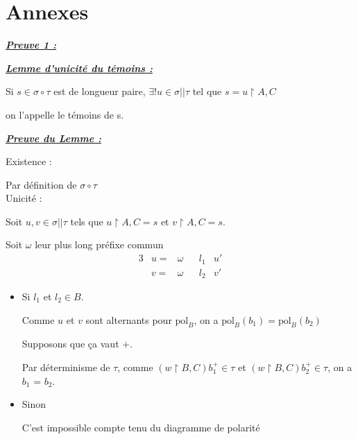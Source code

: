 \documentclass[a4paper,12pt]{article}
\renewenvironment{leftbar}{
  \def\FrameCommand{\vrule width 1pt \hspace{10pt}}
  \MakeFramed {\advance\hsize-\width \FrameRestore}
\setlength{\parskip}{10pt}}
 {\endMakeFramed}
\newenvironment{answer}[1]
{
  \vspace{0.5cm} \noindent \begin{minipage}{\linewidth}
    \textbf{\textit{\uline{#1}}}
    \begin{leftbar}
}
{
    \end{leftbar}\end{minipage}\vspace{0.2cm}
}
\begin{document}
\section{Annexes}
\newpage
\begin{answer}{Preuve 1 :}

\begin{answer}{Lemme d'unicité du témoins :}
Si $s \in \sigma \circ \tau$ est de longueur paire,
$\exists ! u \in \sigma||\tau $ tel que $ s = u \upharpoonright A,C$

on l'appelle le témoins de s.

\end{answer}

\begin{answer}{Preuve du Lemme :}
Existence :

Par définition de $\sigma \circ \tau$
\\

Unicité :

Soit $u,v \in \sigma || \tau$ tels que
$u \upharpoonright A,C = s$ et $v \upharpoonright A, C = s$.

Soit $\omega$ leur plus long préfixe commun
\begin{alignat*}{3}
&u = &\omega &&l_1 &u'\\
&v = &\omega &&l_2 &v'
\end{alignat*}
\begin{itemize}
\item Si $l_1$ et  $l_2 \in B$.

Comme $u$ et $v$ sont alternants pour $\text{pol}_B$,
on a $\text{pol}_B(b_1) = \text{pol}_B(b_2)$

Supposons que ça vaut $+$.

Par déterminisme de $\tau$, comme
$(w\upharpoonright B,C)b_1^+ \in \tau$ et
$(w\upharpoonright B,C)b_2^+ \in \tau$,
on a $b_1$ = $b_2$.

\item Sinon

C'est impossible compte tenu du diagramme de polarité

\end{itemize}

\end{answer}
\end{answer}

\newpage
\end{document}

